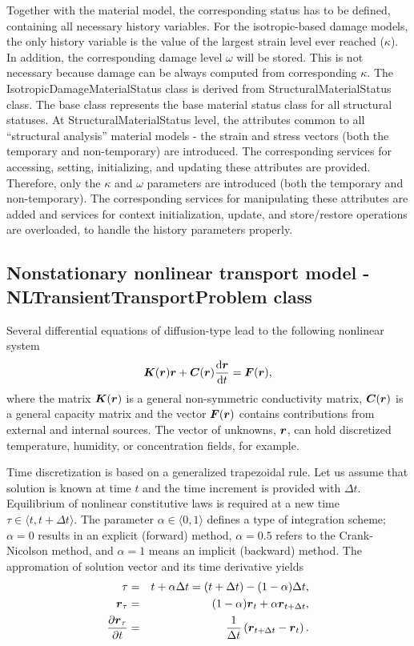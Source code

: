 \documentclass[a4paper]{article}
\newcommand{\mbf}[1]{\mbox{\boldmath$#1$}}
\begin{document}
 Together with the material model, the corresponding status has to be
 defined, containing all necessary history variables.
 For the isotropic-based damage models, the only history variable is
 the value of the largest strain level ever reached ($\kappa$).
 In addition, the corresponding damage level $\omega$ will be stored.
 This is not necessary because damage can be always computed from
 corresponding $\kappa$.
 The IsotropicDamageMaterialStatus class is derived from
 StructuralMaterialStatus class. The base class represents the
 base material status class for all structural statuses. At
 StructuralMaterialStatus level, the attributes common to all
 ``structural analysis'' material models - the strain and
 stress vectors (both the temporary and non-temporary) are introduced. The
 corresponding services for accessing, setting, initializing, and
 updating these attributes are provided.
 Therefore, only the $\kappa$ and $\omega$ parameters are introduced
 (both the temporary and non-temporary). The corresponding services for
 manipulating these attributes are added and services for context
 initialization, update, and store/restore operations are overloaded, to
 handle the history parameters properly.

\subsection{Nonstationary nonlinear transport model - NLTransientTransportProblem class}
\label{NonNonTrans}

Several differential equations of diffusion-type lead to the following nonlinear system
\begin{eqnarray}
\mbf{K}(\mbf{r}) \mbf{r} + \mbf{C}(\mbf{r})\frac{{\rm d}\mbf{r}}{{\rm d} t} = \mbf{F}(\mbf{r})\label{NonNonTrans:1},
\end{eqnarray}
where the matrix $\mbf{K}(\mbf{r})$ is a general non-symmetric conductivity matrix, $\mbf{C}(\mbf{r})$ is a general capacity matrix and the vector $\mbf{F}(\mbf{r})$ contains contributions from external and internal sources. The vector of unknowns, $\mbf{r}$, can hold discretized temperature, humidity, or concentration fields, for example.

Time discretization is based on a generalized trapezoidal rule. Let us assume that solution is known at time $t$ and the time increment is provided with $\Delta t$. Equilibrium of nonlinear constitutive laws is required at a new time $\tau\in\langle t,t+\Delta t \rangle$. The parameter $\alpha\in\langle 0, 1\rangle$ defines a type of integration scheme; $\alpha=0$ results in an explicit (forward) method, $\alpha=0.5$ refers to the Crank-Nicolson method, and $\alpha=1$ means an implicit (backward) method. The appromation of solution vector and its time derivative yields
\begin{eqnarray}
\tau &=& t+\alpha\Delta t = (t+\Delta t) - (1-\alpha)\Delta t,\label{NonNonTrans:2}\\
\mbf{r}_{\tau} &=& (1-\alpha)\mbf{r}_t+\alpha\mbf{r}_{t+\Delta t},\label{NonNonTrans:3}\\
\frac{\partial{\mbf{r}_{\tau}}}{\partial t} &=& \frac{1}{\Delta t}\left(\mbf{r}_{t+\Delta t}-\mbf{r}_t\right).\label{NonNonTrans:4}
\end{eqnarray}
\end{document}
